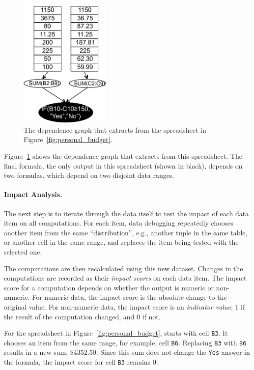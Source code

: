 \begin{figure}[!b]
\centering
\includegraphics[width=1.75in]{dependence-graph}
\caption{The dependence graph that \checkcell{} extracts from the spreadsheet in Figure~\ref{fig:personal_budget}.\label{fig:dependence-graph}}
\end{figure}
 
Figure~\ref{fig:dependence-graph} shows the dependence graph that \checkcell{}
extracts from this spreadsheet. The final formula, the only output in
this spreadsheet (shown in black), depends on two formulas, which depend on two
disjoint data ranges.


\paragraph{Impact Analysis.}
The next step is to iterate through the data itself to test the impact
of each data item on all computations. For each item, data debugging
repeatedly chooses another item from the same ``distribution'', e.g.,
another tuple in the same table, or another cell in the same range,
and replaces the item being tested with the selected one.

The computations are then recalculated using this new dataset. Changes
in the computations are recorded as their \emph{impact scores} on each
data item.  The impact score for a computation depends on whether the
output is numeric or non-numeric. For numeric data, the impact score
is the absolute change to the original value.
For non-numeric data, the impact score is an \emph{indicator value}: 1
if the result of the computation changed, and 0 if not.

For the spreadsheet in Figure~\ref{fig:personal_budget}, \checkcell{}
starts with cell \texttt{B3}. It chooses an item from the same
range, for example, cell \texttt{B6}. Replacing \texttt{B3}
with \texttt{B6} results in a new sum, \$4352.50. Since this sum does
not change the \texttt{Yes} answer in the formula, the impact score
for cell \texttt{B3} remains 0.

